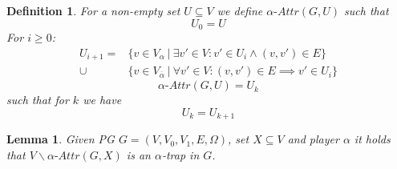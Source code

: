 \documentclass[]{article}
\newtheorem{definition}{Definition}[section]
\newtheorem{lemma}[theorem]{Lemma}
\begin{document}
\begin{definition}\cite{ZIELONKA1998135}
	\label{def_attr}
	For a non-empty set $U \subseteq V$ we define $\alpha\textit{-Attr}(G,U)$ such that
	\[U_0 = U \]
	For $i \geq 0$:
	\begin{align*}
	U_{i+1} = &\{v \in V_\alpha\ |\ \exists v' \in V : v' \in U_i \wedge (v,v') \in E \}\\
	\cup &\{v \in V_{\overline{\alpha}}\ |\ \forall v' \in V :(v,v') \in E \implies v' \in U_i \}
	\end{align*}
	\[\alpha\textit{-Attr}(G,U) = U_k \]
	such that for $k$ we have
	\[U_k = U_{k+1} \]
\end{definition}

\begin{lemma}\cite{ZIELONKA1998135}
	\label{lem_ZIELONKA_attr_is_trap}
	Given PG $G = (V, V_0, V_1, E, \Omega)$, set $X \subseteq V$ and player $\alpha$ it holds that $V\backslash \alpha\textit{-Attr}(G,X)$ is an $\alpha$-trap in $G$.
\end{lemma}
\end{document}
